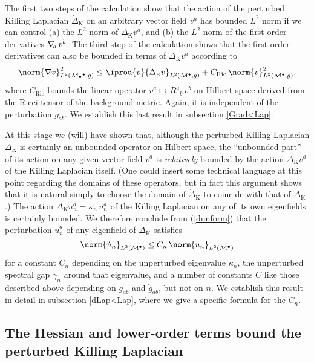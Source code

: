\documentclass[12pt,letterpaper]{iopart}
\newcommand\Lap[1][K]{\Delta_{\scriptscriptstyle\mathrm{#1}}}
\newcommand\dLap[1][K]{\dot\Delta_{\scriptscriptstyle\mathrm{#1}}}
\newcommand\M{\mathcal{M}}
\newcommand\ind{{\bullet}}
\DeclareMathOperator\Ric{Ric}
\begin{document}
The first two steps of the calculation show that the action of the perturbed Killing Laplacian $\dLap$ on an arbitrary vector field $v^a$ has bounded $L^2$ norm if we can control (a) the $L^2$ norm of $\Lap v^a$, and (b) the $L^2$ norm of the first-order derivatives $\nabla\!_a\, v^b$.  The third step of the calculation shows that the first-order derivatives can also be bounded in terms of $\Lap v^a$ according to 
%
\begin{equation}\label{GradLap}
	\norm{\grad v}^2_{L^2(\M_\ind{}^\ind, g)} \le 
		\iprod{v}{\Lap v}_{L^2(\M^\ind, g)} 
		+ C_{\Ric}\, \norm{v}^2_{L^2(\M^\ind, g)}, 
\end{equation}
%
where $C_{\Ric}$ bounds the linear operator $v^a \mapsto R^a{}_b\, v^b$ on Hilbert space derived from the Ricci tensor of the background metric.  Again, it is independent of the perturbation $\dot g_{ab}$.  We establish this last result in subsection \ref{Grad<Lap}.

At this stage we (will) have shown that, although the perturbed Killing Laplacian $\dLap$ is certainly an unbounded operator on Hilbert space, the ``unbounded part'' of its action on any given vector field $v^a$ is \textit{relatively} bounded by the action $\Lap v^a$ of the Killing Laplacian itself.  (One could insert some technical language at this point regarding the domains of these operators, but in fact this argument shows that it is natural simply to choose the domain of $\dLap$ to coincide with that of $\Lap$.)  The action $\Lap u_n^a = \kappa_n\, u_n^a$ of the Killing Laplacian on any of its own eigenfields is certainly bounded.  We therefore conclude from (\ref{dunform}) that the perturbation $\dot u_n^a$ of any eigenfield of $\Lap$ satisfies
%
\begin{equation}\label{unBound}
	\norm{\dot u_n}_{L^2(\M^\ind)} \le C_n\, \norm{u_n}_{L^2(\M^\ind)}
\end{equation}
%
for a constant $C_n$ depending on the unperturbed eigenvalue $\kappa_n$, the unperturbed spectral gap $\gamma_n$ around that eigenvalue, and a number of constants $C$ like those described above depending on $g_{ab}$ and $\dot g_{ab}$, but not on $n$.  We establish this result in detail in subsection \ref{dLap<Lap}, where we give a specific formula for the $C_n$.


\subsection{The Hessian and lower-order terms bound the perturbed Killing Laplacian}
\label{dLap<Hess}
\end{document}

